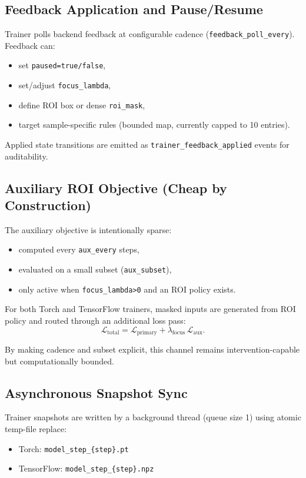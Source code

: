 \documentclass[11pt]{article}
\begin{document}
\subsection{Feedback Application and Pause/Resume}
Trainer polls backend feedback at configurable cadence (\texttt{feedback\_poll\_every}).
Feedback can:
\begin{itemize}[leftmargin=1.5em]
  \item set \texttt{paused=true/false},
  \item set/adjust \texttt{focus\_lambda},
  \item define ROI box or dense \texttt{roi\_mask},
  \item target sample-specific rules (bounded map, currently capped to 10 entries).
\end{itemize}

Applied state transitions are emitted as \texttt{trainer\_feedback\_applied} events for auditability.

\subsection{Auxiliary ROI Objective (Cheap by Construction)}
The auxiliary objective is intentionally sparse:
\begin{itemize}[leftmargin=1.5em]
  \item computed every \texttt{aux\_every} steps,
  \item evaluated on a small subset (\texttt{aux\_subset}),
  \item only active when \texttt{focus\_lambda>0} and an ROI policy exists.
\end{itemize}

For both Torch and TensorFlow trainers, masked inputs are generated from ROI policy and routed through an additional loss pass:
\begin{equation}
\mathcal{L}_{\text{total}} = \mathcal{L}_{\text{primary}} + \lambda_{\text{focus}}\,\mathcal{L}_{\text{aux}}.
\end{equation}

By making cadence and subset explicit, this channel remains intervention-capable but computationally bounded.

\subsection{Asynchronous Snapshot Sync}
Trainer snapshots are written by a background thread (queue size 1) using atomic temp-file replace:
\begin{itemize}[leftmargin=1.5em]
  \item Torch: \texttt{model\_step\_\{step\}.pt}
  \item TensorFlow: \texttt{model\_step\_\{step\}.npz}
\end{itemize}
\end{document}
